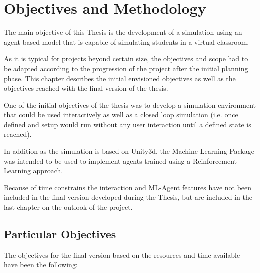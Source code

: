 \chapter{Objectives and Methodology}
The main objective of this Thesis is the development of a simulation using an
agent-based model that is capable of simulating students in a virtual classroom.

\bb

As it is typical for projects beyond certain size, the objectives and scope had to
be adapted according to the progression of the project after the initial planning phase.
This chapter describes the initial envisioned objectives as well as the objectives
reached with the final version of the thesis.

One of the initial objectives of the thesis was to develop a simulation environment that
could be used interactively as well as a closed loop simulation (i.e. once defined
and setup would run without any user interaction until a defined state is reached).

In addition as the simulation is based on Unity3d, the Machine Learning Package
was intended to be used to implement agents trained using a Reinforcement Learning approach.

Because of time constrains the interaction and ML-Agent features have not been included
in the final version developed during the Thesis, but are included in the last chapter
on the outlook of the project.

\section{Particular Objectives}

The objectives for the final version based on the resources and time available
have been the following:

